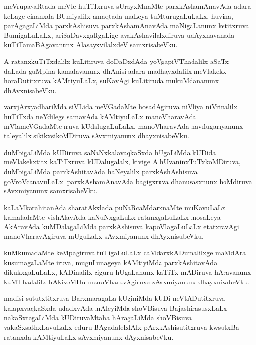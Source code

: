 \documentclass{article}
\begin{document}
\begin{mn}%
meVrupavaRtada meVle huTiTxruva sUrayxMnaMte parxkAshamAnavAda adara keLage cinanxda 
BUmiyalilx amaqtada maLeya tuMturugaLuLaLx, huvina, parAgagaLiMda parxkAshisuva 
parxkAshamAnavAda maNigaLanunx ketitxruva BumigaLuLaLx, ariSaDavxgaRgaLige 
avakAshavilalxdiruva udAyxnavanada kuTiTamaBAgavanunx AlasayxvilalxdeV samxrisabeVku.
\end{mn}

\begin{mn}%
A ratanxkuTiTxdalilx kuLitiruva doDaDxdAda yoVgapiVThadalilx aSaTx daLada guMpina 
kamalavanunx dhAnisi adara madhayxdalilx meVlakekx horaDutitxruva kAMtiyuLaLx, suKavAgi 
kuLitiruda mukuMdananunx dhAyxnisabeVku.
\end{mn}

\begin{mn}%
varxjArxyadhariMda siVLida meVGadaMte hosadAgiruva niVliya niVrinalilx huTiTxda neYdilege 
samavAda kAMtiyuLaLx manoVharavAda niVlameVGadaMte iruva kUdalugaLuLaLx, manoVharavAda 
navilugariyanunx taleyalilx sikikxsikoMDiruva sAvxmiyanunx dhayxnisabeVku.
\end{mn}

\begin{mn}%
duMbigaLiMda kUDiruva saNaNxkalavaqkaSxda hUgaLiMda kUDida meVlakekxtitx kaTiTxruva 
kUDalugalalx, kivige A hUvaninxTuTxkoMDiruva, duMbigaLiMda parxkAshitavAda haNeyalilx 
parxkAshAshisuva goVroVcanavuLaLx, parxkAshamAnavAda bagigxruva dhanusasxnunx hoMdiruva 
sAvxmiyanunx samxrisabeVku.
\end{mn}

\begin{mn}%
kaLaMkarahitanAda sharatAkxlada puNaRcaMdarxnaMte muKavuLaLx kamaladaMte vishAlavAda 
kaNuNxgaLuLx ratanxgaLuLaLx mosaLeya AkAravAda kuMDalagaLiMda parxkAshisuva 
kapoVlagaLuLaLx etatxravAgi manoVharavAgiruva mUguLaLx sAvxmiyanunx dhAyxnisubeVku.
\end{mn}

\begin{mn}%
kuMkumadaMte keMpagiruva tuTigaLuLaLx caMdarxkADumalilxge maMdAra kusumagaLaMte iruva, 
muguLunageya kAMtiyiMda parxkAshitavAda dikukxgaLuLaLx, kADinalilx ciguru hUgaLanunx 
kaTiTx mADiruva hAravanunx kaMThadalilx hAkikoMDu manoVharavAgiruva sAvxmiyanunx 
dhayxnisabeVku.
\end{mn}

\begin{mn}%
madisi sututxtitxruva BarxmaragaLa kUginiMda kUDi neVtADutitxruva kalapxvaqkaSxda 
udadxvAda mAleyiMda shoVBisuva BajashirasusxLaLx nakaSxtagaLiMda kUDiruvaMtaha hAragaLiMda 
shoVBisuva vakaSxsathxLavuLaLx eduru BAgadalelxlAlx pArxkAshisutitxruva kwsutxBa ratanxda 
kAMtiyuLaLx sAvxmiyanunx dAyxnisabeVku.
\end{mn}
\end{document}
